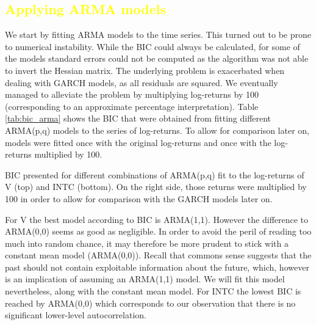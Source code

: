 \begin{figure}[h]
    \centering
    \begin{adjustbox}{width=.95\textwidth,center}
    
    
    \end{adjustbox}
    \caption{}
    \label{fig:ljungbox}
\end{figure}{}

\subsection{\textcolor{yellow}{Applying ARMA models}}
We start by fitting ARMA models to the time series. This turned out to be prone to numerical instability. While the BIC could always be calculated, for some of the models standard errors could not be computed as the algorithm was not able to invert the Hessian matrix. The underlying problem is exacerbated when dealing with GARCH models, as all residuals are squared. We eventually managed to alleviate the problem by multiplying log-returns by 100 (corresponding to an approximate percentage interpretation). Table \ref{tab:bic_arma} shows the BIC that were obtained from fitting different ARMA(p,q) models to the series of log-returns. To allow for comparison later on, models were fitted once with the original log-returns and once with the log-returns multiplied by 100. 

\begin{table}
    \centering
    
    \caption{BIC presented for different combinations of ARMA(p,q) fit to the log-returns of V (top) and INTC (bottom). On the right side, those returns were multiplied by 100 in order to allow for comparison with the GARCH models later on.}
    \label{tab:bic_arma}
\end{table}{}

For V the best model according to BIC is ARMA(1,1). However the difference to ARMA(0,0) seems as good as negligible. In order to avoid the peril of reading too much into random chance, it may therefore be more prudent to stick with a constant mean model (ARMA(0,0)). Recall that commons sense suggests that the past should not contain exploitable information about the future, which, however is an implication of assuming an ARMA(1,1) model. We will fit this model nevertheless, along with the constant mean model. For INTC the lowest BIC is reached by ARMA(0,0) which corresponds to our observation that there is no significant lower-level autocorrelation. 

